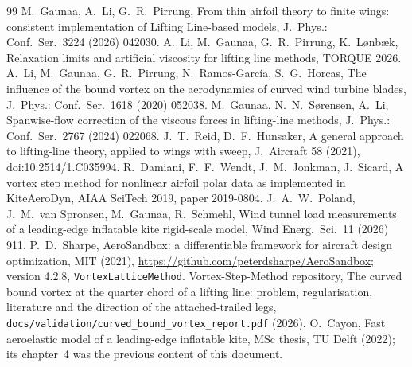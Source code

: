 \documentclass[11pt,a4paper]{article}
\newcommand{\code}[1]{\texttt{#1}}
\begin{document}
\begin{thebibliography}{99}\small
{} M.~Gaunaa, A.~Li, G.~R.~Pirrung, From thin airfoil theory to finite wings: consistent implementation of Lifting Line-based models, J.\ Phys.: Conf.\ Ser.\ 3224 (2026) 042030.
 A.~Li, M.~Gaunaa, G.~R.~Pirrung, K.~L{\o}nb{\ae}k, Relaxation limits and artificial viscosity for lifting line methods, TORQUE 2026.
 A.~Li, M.~Gaunaa, G.~R.~Pirrung, N.~Ramos-Garc\'ia, S.~G.~Horcas, The influence of the bound vortex on the aerodynamics of curved wind turbine blades, J.\ Phys.: Conf.\ Ser.\ 1618 (2020) 052038.
 M.~Gaunaa, N.~N.~S{\o}rensen, A.~Li, Spanwise-flow correction of the viscous forces in lifting-line methods, J.\ Phys.: Conf.\ Ser.\ 2767 (2024) 022068.
 J.~T.~Reid, D.~F.~Hunsaker, A general approach to lifting-line theory, applied to wings with sweep, J.\ Aircraft 58 (2021), doi:10.2514/1.C035994.
 R.~Damiani, F.~F.~Wendt, J.~M.~Jonkman, J.~Sicard, A vortex step method for nonlinear airfoil polar data as implemented in KiteAeroDyn, AIAA SciTech 2019, paper 2019-0804.
 J.~A.~W.~Poland, J.~M.~van Spronsen, M.~Gaunaa, R.~Schmehl, Wind tunnel load measurements of a leading-edge inflatable kite rigid-scale model, Wind Energ.\ Sci.\ 11 (2026) 911.
 P.~D.~Sharpe, AeroSandbox: a differentiable framework for aircraft design optimization, MIT (2021), \url{https://github.com/peterdsharpe/AeroSandbox}; version 4.2.8, \code{VortexLatticeMethod}.
 Vortex-Step-Method repository, The curved bound vortex at the quarter chord of a lifting line: problem, regularisation, literature and the direction of the attached-trailed legs, \code{docs/validation/curved\_bound\_vortex\_report.pdf} (2026).
 O.~Cayon, Fast aeroelastic model of a leading-edge inflatable kite, MSc thesis, TU Delft (2022); its chapter~4 was the previous content of this document.
\end{thebibliography}
\end{document}
